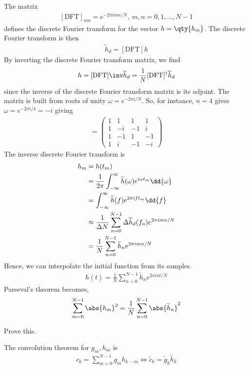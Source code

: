 The matrix 
\begin{align} \label{eq:8.48}
	[\mathrm{DFT}]_{mn} = e^{-2\pi i m n / N},\ m, n = 0, 1, \dots, N-1
\end{align} defines the discrete Fourier transform for the vector $h = \qty{h_m}$.
The discrete Fourier transform is then
\begin{align*}
	\widetilde h_d = [\mathrm{DFT}] h
\end{align*}
By inverting the discrete Fourier transform matrix, we find
\begin{align*}
	h = [\mathrm{DFT}]\inv \widetilde h_d = \frac{1}{N} [\mathrm{DFT}]^\dagger \widetilde h_d
\end{align*}
since the inverse of the discrete Fourier transform matrix is its adjoint.
The matrix is built from roots of unity $\omega = e^{-2\pi i/N}$.
So, for instance, $n = 4$ gives $\omega = e^{-2\pi i/4} = -i$ giving
\begin{align*}
	[\mathrm{DFT}] = \begin{pmatrix}
		1 & 1  & 1  & 1  \\
		1 & -i & -1 & i  \\
		1 & -1 & 1  & -1 \\
		1 & i  & -1 & -i
	\end{pmatrix}
\end{align*}
The inverse discrete Fourier transform is
\begin{align}
	h_m &= h(t_m) \notag \\
	    &= \frac{1}{2\pi} \int_{-\infty}^\infty \widetilde h(\omega) e^{i \omega t_m} \dd{\omega} \notag \\
	    &= \int_{-\infty}^\infty \widetilde h(f) e^{2\pi i f t_m} \dd{f} \notag \\
	    &\approx \frac{1}{\Delta N} \sum_{n=0}^{N-1} \Delta \widetilde h_d(f_n) e^{2\pi i m n / N} \notag \\
	    &= \frac{1}{N} \sum_{n=0}^{N-1} \widetilde h_n e^{2\pi i m n / N} \label{eq:8.48}
\end{align}
Hence, we can interpolate the initial function from its samples.
\begin{align*}
	h(t) = \frac{1}{N} \sum_{n=0}^{N-1} \widetilde h_n e^{2\pi i n t / N}
\end{align*}
Parseval's theorem becomes,
\begin{align} \label{eq:8.49}
	\sum_{m=0}^{N-1} \abs{h_m}^2 = \frac{1}{N} \sum_{n=0}^{N-1} \abs{\widetilde h_n}^2
\end{align}
\begin{exercise}
	Prove this.
\end{exercise} 
The convolution theorem for $g_m, h_m$ is
\begin{align} \label{eq:8.50}
	c_k = \sum_{m=0}^{N-1} g_m h_{k-m} \iff \widetilde c_k = \widetilde g_k \widetilde h_k
\end{align}

